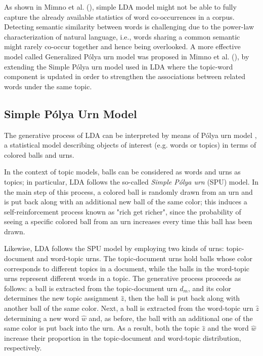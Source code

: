 \documentclass[letterpaper]{article}
\begin{document}
As shown in Mimno et al. (\citeyear{Mimno11}), simple LDA model might not be able to fully capture the already available statistics of word co-occurrences in a corpus. Detecting semantic similarity between words is challenging due to the power-law characterization of natural language, i.e., words sharing a common semantic might rarely co-occur together and hence being overlooked. %
A more effective model called Generalized P\'{o}lya urn model was proposed in Mimno et al. (\citeyear{Mimno11}), by extending the Simple P\'{o}lya urn model used in LDA where the topic-word component is updated in order to strengthen the associations between related words under the same topic. 


\subsection{Simple P\'{o}lya Urn Model}
The generative process of LDA can be interpreted by means of P\'{o}lya urn model \cite{Mahmoud08}, a statistical model describing objects of interest (e.g. words or topics) in terms of colored balls and urns. 

In the context of topic models, balls can be considered as words and urns as topics; in particular, LDA follows the so-called \textit{Simple P\'{o}lya urn} (SPU) model. In the main step of this process, a colored ball is randomly drawn from an urn and is put back along with an additional new ball of the same color; this induces a self-reinforcement process known as "rich get richer", since the probability of seeing a specific colored ball from an urn increases every time this ball has been drawn.

Likewise, LDA follows the SPU model by employing two kinds of urns: topic-document and word-topic urns. The topic-document urns hold balls whose color corresponds to different topics in a document, while the balls in the word-topic urns represent different words in a topic. 
The generative process proceeds as follows: a ball is extracted from the topic-document urn $d_m$, and its color determines the new topic assignment $\hat{z}$, then the ball is put back along with another ball of the same color. Next, a ball is extracted from the word-topic urn $\hat{z}$ determining a new word $\hat{w}$ and, as before, the ball with an additional one of the same color is put back into the urn.
As a result, both the topic $\hat{z}$ and the word $\hat{w}$ increase their proportion in the topic-document and word-topic distribution, respectively.
\end{document}
